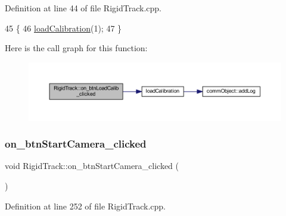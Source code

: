 Definition at line 44 of file Rigid\+Track.\+cpp.


\begin{DoxyCode}
45 \{
46     \hyperlink{main_8cpp_ad39626702ff983d5fdab4b703bfaf964}{loadCalibration}(1);
47 \}
\end{DoxyCode}
Here is the call graph for this function\+:\nopagebreak
\begin{figure}[H]
\begin{center}
\leavevmode
\includegraphics[width=350pt]{class_rigid_track_a2224d3f6d923a1c7bad356f49d7a4124_cgraph}
\end{center}
\end{figure}
\mbox{\label{class_rigid_track_a2f226856e28868c8bb1854fa16531f60}} 
\subsubsection{\texorpdfstring{on\+\_\+btn\+Start\+Camera\+\_\+clicked}{on\_btnStartCamera\_clicked}}
{\footnotesize\ttfamily void Rigid\+Track\+::on\+\_\+btn\+Start\+Camera\+\_\+clicked (\begin{DoxyParamCaption}{ }\end{DoxyParamCaption})\hspace{0.3cm}{\ttfamily [slot]}}



Definition at line 252 of file Rigid\+Track.\+cpp.


